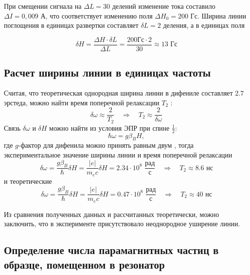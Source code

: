 \documentclass[a4paper,14pt]{extarticle}
\begin{document}
При смещении сигнала на $\Delta L=30 \text{ делений}$ изменение тока составило $\Delta I=0,009 \text{ А}$, что соответствует изменению поля $\Delta H_0=200 \text{ Гс}$. Ширина линии поглощения в единицах развертки составляет $\delta L=2 \text{ деления}$, а в единицах поля 

\begin{equation}
  \delta H = \frac{\Delta H\cdot \delta L}{\Delta L}=\frac{200 Гс\cdot 2}{30}\approx 13 \text{ Гс}
\end{equation}

\subsection{Расчет ширины линии в единицах частоты}
Считая, что теоретическая однородная ширина линии в дифениле составляет $2.7$ эрстеда, можно найти время поперечной релаксации $T_2$ :
\begin{equation}
  \delta \omega \approx \frac{2}{T_2} \quad \Rightarrow \quad
  T_2 \approx \frac{2}{\delta \omega} 
\end{equation}
Связь $\delta \omega$ и $\delta H$ можно найти из условия ЭПР при спине $\frac12$:
\begin{equation}
  \hbar \omega = g \beta_B H,
\end{equation}
где $g$-фактор для дифенила можно принять равным двум \cite[стр. 16]{mar}, тогда экспериментальное значение ширины линии и время поперечной релаксации
\begin{equation}
  \delta \omega = \frac{g\beta_B}{\hbar} \delta H = \frac{|e|}{m_e c} \delta H = 2.34 \cdot 10^8 \,\,\frac{\text{рад}}{\text{с}}
  \quad \Rightarrow \quad
  T_2 \approx 8.6 \text{ нс}
\end{equation}
и теоретические 
\begin{equation}
  \delta \omega = \frac{g\beta_B}{\hbar} \delta H = \frac{|e|}{m_e c} \delta H = 0.47 \cdot 10^8 \,\,\frac{\text{рад}}{\text{с}}
  \quad \Rightarrow \quad
  T_2 \approx 40 \text{ нс}
\end{equation}

Из сравнения полученных данных и рассчитанных теоретически, можно заключить, что в эксперименте присутствовало неоднородное уширение линии. 

\subsection{Определение числа парамагнитных частиц в образце, помещенном в резонатор}
\end{document}
